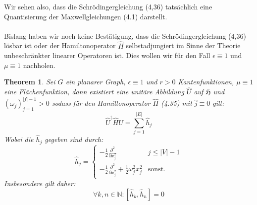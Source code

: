 \documentclass[11pt,a4paper,leqno]{report}
\newtheorem{theorem}{Theorem}[chapter]
\numberwithin{equation}{chapter}
\begin{document}
\noindent
Wir sehen also, dass die Schr\"odingergleichung (4,36) tats\"achlich eine Quantisierung der Maxwellgleichungen (4.1) darstellt.
\\
\\

Bislang haben wir noch keine Bestätigung, dass die Schr\"odingergleichung (4,36) l\"osbar ist oder der Hamiltonoperator $\hat{H}$ selbstadjungiert im Sinne der Theorie unbeschr\"ankter linearer Operatoren ist. Dies wollen wir f\"ur den Fall $\epsilon\equiv 1$ und $\mu\equiv 1$ nachholen.
\begin{theorem}
	Sei $G$ ein planarer Graph, $\epsilon\equiv 1$ und $r>0$ Kantenfunktionen, $\mu\equiv 1$ eine Fl\"achenfunktion, dann existiert eine unit\"are Abbildung $\hat{U}$ auf $\mathfrak{H}$ und $(\omega_j)_{j=1}^{|f|-1}>0$ sodass f\"ur den Hamiltonoperator $\hat{H}$ (4.35) mit $\hat{j}\equiv 0 $ gilt:
	\begin{equation}
	\hat{U}^\dagger\hat{H}\hat{U}  = \sum_{j=1}^{|E|}\hat{h}_j
	\end{equation}
Wobei die $\hat{h}_j$ gegeben sind durch:
\[\hat{h}_j= \begin{cases} 
-\frac{1}{2}\frac{\partial^2}{\partial x_j^2} & j\leq |V| - 1 \\
-\frac{1}{2}\frac{\partial^2}{\partial x_j^2} + \frac{1}{2}\omega_j^2 x_j^2 & \text{sonst.} 
\end{cases}
\]
Insbesondere gilt daher:
\begin{equation*}
	\forall k,n \in \mathbb{N}:[\hat{h}_k, \hat{h}_n]=0 
\end{equation*}
\end{theorem}
\end{document}
